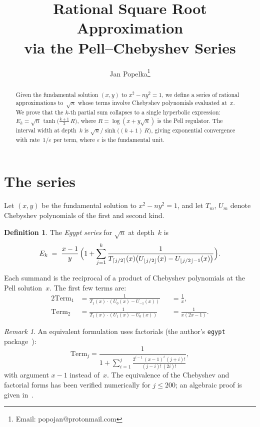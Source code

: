\documentclass[11pt]{article}
\title{Rational Square Root Approximation\\via the Pell--Chebyshev Series}
\author{Jan Popelka\thanks{Email: popojan@protonmail.com}}
\date{}
\theoremstyle{definition}
\newtheorem{definition}[theorem]{Definition}
\theoremstyle{remark}
\newtheorem{remark}[theorem]{Remark}
\begin{document}
\maketitle

\begin{abstract}
Given the fundamental solution $(x,y)$ to $x^2 - ny^2 = 1$,
we define a series of rational approximations to~$\sqrt{n}$
whose terms involve Chebyshev polynomials evaluated at~$x$.
We prove that the $k$-th partial sum collapses to a single
hyperbolic expression:
$E_k = \sqrt{n}\,\tanh\bigl(\tfrac{k+1}{2}\,R\bigr)$,
where $R = \log(x + y\sqrt{n})$ is the Pell regulator.
The interval width at depth~$k$ is $\sqrt{n}/\sinh\bigl((k{+}1)\,R\bigr)$,
giving exponential convergence with rate~$1/\varepsilon$ per term,
where $\varepsilon$ is the fundamental unit.
\end{abstract}

\section{The series}

Let $(x,y)$ be the fundamental solution to $x^2 - ny^2 = 1$,
and let $T_m$, $U_m$ denote Chebyshev polynomials of the first
and second kind.

\begin{definition}\label{def:series}
The \emph{Egypt series} for $\sqrt{n}$ at depth~$k$ is
\begin{equation}\label{eq:egypt}
E_k \;=\; \frac{x-1}{y}\,\Bigl(1 + \sum_{j=1}^{k}
  \frac{1}{T_{\lceil j/2\rceil}(x)\bigl(
  U_{\lfloor j/2\rfloor}(x)
  - U_{\lfloor j/2\rfloor - 1}(x)\bigr)}\Bigr).
\end{equation}
\end{definition}

Each summand is the reciprocal of a product of Chebyshev polynomials
at the Pell solution~$x$.
The first few terms are:
\begin{alignat*}{2}
\text{Term}_1 &= \frac{1}{T_1(x) \cdot (U_0(x) - U_{-1}(x))}
              &&= \frac{1}{x}, \\[3pt]
\text{Term}_2 &= \frac{1}{T_1(x) \cdot (U_1(x) - U_0(x))}
              &&= \frac{1}{x(2x-1)}.
\end{alignat*}

\begin{remark}
An equivalent formulation uses factorials (the author's
\texttt{egypt} package~\cite{egypt-repo}):
\[
\text{Term}_j = \frac{1}{1 + \sum_{i=1}^{j}
  \frac{2^{i-1}\,(x{-}1)^i\,(j{+}i)!}{(j{-}i)!\,(2i)!}},
\]
with argument $x - 1$ instead of~$x$.
The equivalence of the Chebyshev and factorial forms has been
verified numerically for $j \le 200$;
an algebraic proof is given in~\cite{Popelka2025egypt}.
\end{remark}
\end{document}

